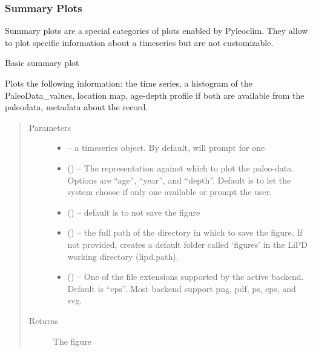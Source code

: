 \documentclass[letterpaper,10pt,english]{sphinxmanual}
\begin{document}
\subsubsection{Summary Plots}
\label{\detokenize{Main:summary-plots}}
Summary plots are a special categories of plots enabled by Pyleoclim.
They allow to plot specific information about a timeseries but are not customizable.

\begin{fulllineitems}
\label{\detokenize{Main:pyleoclim.summaryTs}}
Basic summary plot

Plots the following information: the time series, a histogram of
the PaleoData\_values, location map, age-depth profile if both are
available from the paleodata, metadata about the record.
\begin{quote}\begin{description}
\item[{Parameters}] \leavevmode\begin{itemize}
\item {} 
 -- a timeseries object. By default, will prompt for one

\item {} 
 () -- The representation against which to plot the paleo-data.
Options are ``age'', ``year'', and ``depth''. Default is to let the
system choose if only one available or prompt the user.

\item {} 
 () -- default is to not save the figure

\item {} 
 () -- the full path of the directory in which to save the figure.
If not provided, creates a default folder called `figures' in the
LiPD working directory (lipd.path).

\item {} 
 () -- One of the file extensions supported by the active
backend. Default is ``eps''. Most backend support png, pdf, ps, eps,
and svg.

\end{itemize}

\item[{Returns}] \leavevmode
The figure

\end{description}\end{quote}

\end{fulllineitems}
\end{document}
